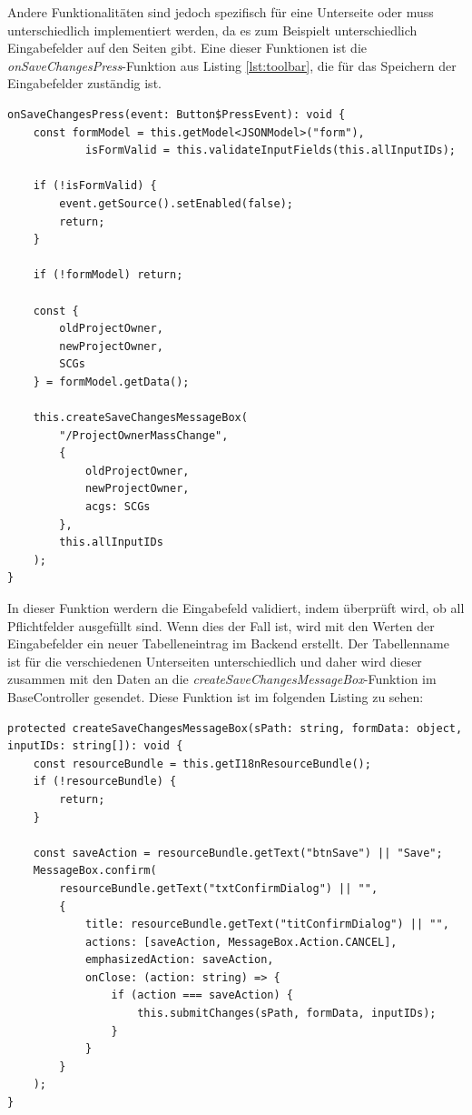 Andere Funktionalitäten sind jedoch spezifisch für eine Unterseite oder muss unterschiedlich implementiert werden, da es zum Beispielt unterschiedlich Eingabefelder auf den Seiten gibt.
Eine dieser Funktionen ist die \textit{onSaveChangesPress}-Funktion aus Listing \ref{lst:toolbar}, die für das Speichern der Eingabefelder zuständig ist.

\begin{lstlisting}[caption={onSaveChangesPress Funktion}]
onSaveChangesPress(event: Button$PressEvent): void {
    const formModel = this.getModel<JSONModel>("form"),
            isFormValid = this.validateInputFields(this.allInputIDs);

    if (!isFormValid) {
        event.getSource().setEnabled(false);
        return;
    }

    if (!formModel) return;

    const {
        oldProjectOwner,
        newProjectOwner,
        SCGs
    } = formModel.getData();

    this.createSaveChangesMessageBox(
        "/ProjectOwnerMassChange", 
        {                
            oldProjectOwner,
            newProjectOwner,
            acgs: SCGs
        },
        this.allInputIDs
    );
}
\end{lstlisting}

In dieser Funktion werdern die Eingabefeld validiert, indem überprüft wird, ob all Pflichtfelder ausgefüllt sind.
Wenn dies der Fall ist, wird mit den Werten der Eingabefelder ein neuer Tabelleneintrag im Backend erstellt.
Der Tabellenname ist für die verschiedenen Unterseiten unterschiedlich und daher wird dieser zusammen mit den Daten an die \textit{createSaveChangesMessageBox}-Funktion im BaseController gesendet.
Diese Funktion ist im folgenden Listing zu sehen:

\begin{lstlisting}[caption={createSaveChangesMessageBox Funktion}]
protected createSaveChangesMessageBox(sPath: string, formData: object, inputIDs: string[]): void {
    const resourceBundle = this.getI18nResourceBundle();
    if (!resourceBundle) {
        return;
    }

    const saveAction = resourceBundle.getText("btnSave") || "Save";
    MessageBox.confirm(
        resourceBundle.getText("txtConfirmDialog") || "",
        {
            title: resourceBundle.getText("titConfirmDialog") || "",
            actions: [saveAction, MessageBox.Action.CANCEL],
            emphasizedAction: saveAction,
            onClose: (action: string) => {
                if (action === saveAction) {
                    this.submitChanges(sPath, formData, inputIDs);
                }
            }
        }
    );
} 
\end{lstlisting}

